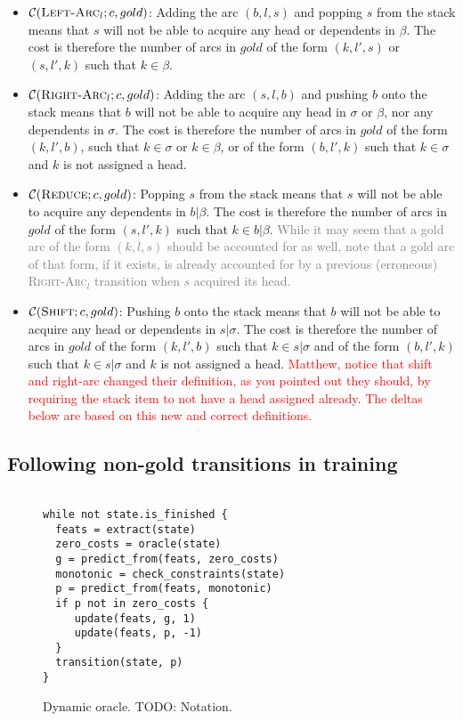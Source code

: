 \documentclass[11pt,letterpaper]{article}
\newcommand{\maybe}[1]{\textcolor{gray}{#1}}
\newcommand{\note}[1]{\textcolor{red}{#1}}
\begin{document}
\begin{itemize}
   \item $\mathcal{C}(\textsc{Left-Arc}_l; c, gold)$: 
Adding the arc $(b, l, s)$ and popping $s$ from the stack means that $s$ will not be able
to acquire any head or dependents in $\beta$. The cost is therefore the number of arcs 
in $gold$ of the form $(k, l', s)$ or $(s, l', k)$ such that $k \in \beta$.

\item $\mathcal{C}(\textsc{Right-Arc}_l; c, gold)$: 
Adding the arc $(s, l, b)$ and pushing $b$ onto the stack means that $b$ will 
not be able to acquire any head in $\sigma$ or $\beta$, nor any dependents in $\sigma$. 
The cost is therefore the number of arcs in $gold$ of the form $(k, l', b)$,
such that $k \in \sigma$ or $k \in \beta$, 
or of the form $(b, l', k)$ such that $k \in \sigma$ 
and $k$ is not assigned a head.

\item $\mathcal{C}(\textsc{Reduce}; c, gold)$: 
Popping $s$ from the stack means that $s$ will not be able to acquire any dependents
in $b|\beta$. The cost is therefore the number of arcs in $gold$ of the form $(s, l', k)$
such that $k \in b|\beta$. \maybe{While it may seem that a gold arc of the form $(k, l, s)$ should be accounted for as well,
note that a gold arc of that form, if it exists, is already accounted for by a previous (erroneous) \textsc{Right-Arc}$_l$ 
transition when $s$ acquired its head.}

\item $\mathcal{C}(\textsc{Shift}; c, gold)$: 
Pushing $b$ onto the stack means that $b$ will not be able to acquire any head
or dependents in $s|\sigma$. The cost is therefore the number of arcs in $gold$ of 
the form $(k, l', b)$ such that $k \in s|\sigma$ and of the form $(b, l', k)$ such that $k \in s|\sigma$
and $k$ is not assigned a head.
\note{Matthew, notice that shift and right-arc changed their definition, as
you pointed out they should, by requiring the stack item to not have a head
assigned already. The deltas below are based on this new and correct
definitions.}
\end{itemize}

\subsection{Following non-gold transitions in training}
\begin{figure}
\centering
    \begin{verbatim}

while not state.is_finished {
  feats = extract(state)
  zero_costs = oracle(state)
  g = predict_from(feats, zero_costs)
  monotonic = check_constraints(state)
  p = predict_from(feats, monotonic)
  if p not in zero_costs {
     update(feats, g, 1)
     update(feats, p, -1)
  }
  transition(state, p)
}
\end{verbatim}
\caption{Dynamic oracle. TODO: Notation.}
\end{figure}
\end{document}
